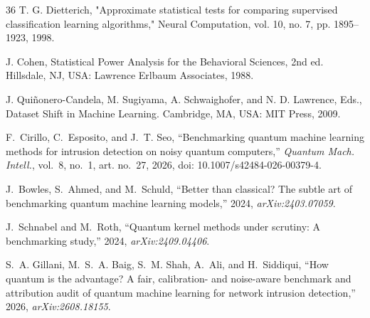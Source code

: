 \begin{thebibliography}{36}
T. G. Dietterich, "Approximate statistical tests for comparing supervised classification learning algorithms," Neural Computation, vol. 10, no. 7, pp. 1895--1923, 1998.

J. Cohen, Statistical Power Analysis for the Behavioral Sciences, 2nd ed. Hillsdale, NJ, USA: Lawrence Erlbaum Associates, 1988.

J. Qui\~nonero-Candela, M. Sugiyama, A. Schwaighofer, and N. D. Lawrence, Eds., Dataset Shift in Machine Learning. Cambridge, MA, USA: MIT Press, 2009.


\begin{revbody}
F.~Cirillo, C.~Esposito, and J.~T. Seo, ``Benchmarking quantum machine
learning methods for intrusion detection on noisy quantum computers,''
\emph{Quantum Mach. Intell.}, vol.~8, no.~1, art. no.~27, 2026,
doi: 10.1007/s42484-026-00379-4.
\end{revbody}

\begin{revbody}
J.~Bowles, S.~Ahmed, and M.~Schuld, ``Better than classical? The subtle art of
benchmarking quantum machine learning models,'' 2024, \emph{arXiv:2403.07059}.
\end{revbody}

\begin{revbody}
J.~Schnabel and M.~Roth, ``Quantum kernel methods under scrutiny: A benchmarking
study,'' 2024, \emph{arXiv:2409.04406}.
\end{revbody}

\begin{revbody}
S.~A. Gillani, M.~S.~A. Baig, S.~M. Shah, A.~Ali, and H.~Siddiqui, ``How quantum
is the advantage? A fair, calibration- and noise-aware benchmark and attribution
audit of quantum machine learning for network intrusion detection,'' 2026,
\emph{arXiv:2608.18155}.
\end{revbody}


\end{thebibliography}
